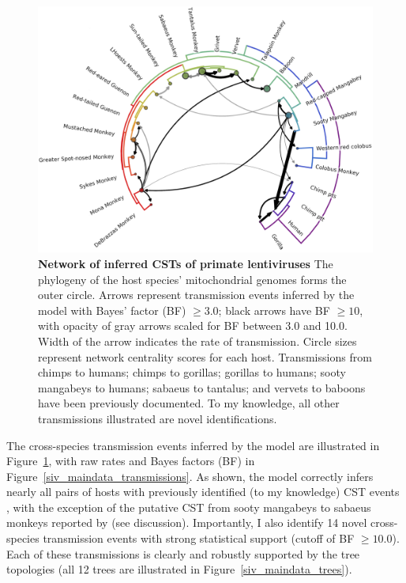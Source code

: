 \begin{figure}[ht!]
  \begin{centering}
    \includegraphics[width=.7\linewidth]{./png/siv_cst.png}
  	\caption[Network of inferred CSTs of primate lentiviruses]{\textbf{Network of inferred CSTs of primate lentiviruses }
The phylogeny of the host species' mitochondrial genomes forms the outer circle.
Arrows represent transmission events inferred by the model with Bayes' factor (BF) $\geq 3.0$; black arrows have BF $\geq 10$, with opacity of gray arrows scaled for BF between 3.0 and 10.0.
Width of the arrow indicates the rate of transmission.
Circle sizes represent network centrality scores for each host.
Transmissions from chimps to humans; chimps to gorillas; gorillas to humans; sooty mangabeys to humans; sabaeus to tantalus; and vervets to baboons have been previously documented.
To my knowledge, all other transmissions illustrated are novel identifications.
    }
  	\label{siv_cst}
  \end{centering}
\end{figure}

The cross-species transmission events inferred by the model are illustrated in Figure~\ref{siv_cst}, with raw rates and Bayes factors (BF) in Figure~\ref{siv_maindata_transmissions}.
As shown, the model correctly infers nearly all pairs of hosts with previously identified (to my knowledge) CST events \citep{bailes2003hybrid,d2015origin,gao1992human,gao1999origin,jin1994infection,leitner2007sequence}, with the exception of the putative CST from sooty mangabeys to sabaeus monkeys reported by \citep{jin1994mosaic} (see discussion).
Importantly, I also identify 14 novel cross-species transmission events with strong statistical support (cutoff of BF $\geq 10.0$).
Each of these transmissions is clearly and robustly supported by the tree topologies (all 12 trees are illustrated in Figure~\ref{siv_maindata_trees}).

